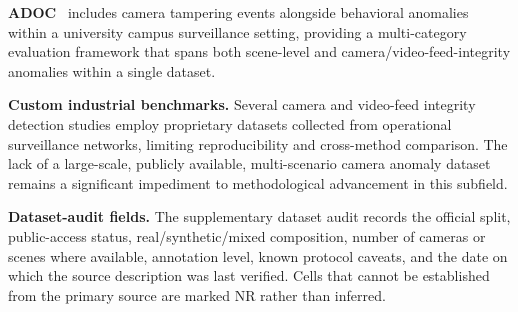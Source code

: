 \documentclass[10pt,a4paper]{article}
\renewcommand{\arraystretch}{1.12}
\begin{document}
\textbf{ADOC}~\citep{doshi2022adoc} includes camera tampering events alongside behavioral anomalies within a university campus surveillance setting, providing a multi-category evaluation framework that spans both scene-level and camera/video-feed-integrity anomalies within a single dataset.

\textbf{Custom industrial benchmarks.} Several camera and video-feed integrity detection studies employ proprietary datasets collected from operational surveillance networks, limiting reproducibility and cross-method comparison. The lack of a large-scale, publicly available, multi-scenario camera anomaly dataset remains a significant impediment to methodological advancement in this subfield.


\begin{table}[!t]
\centering
\caption{Summary of benchmark datasets and study-specific evaluation corpora for camera anomaly and tampering detection.}
\label{tab:camera_datasets}
\renewcommand{\arraystretch}{1.3}
\end{table}


\textbf{Dataset-audit fields.} The supplementary dataset audit records the official split, public-access status, real/synthetic/mixed composition, number of cameras or scenes where available, annotation level, known protocol caveats, and the date on which the source description was last verified. Cells that cannot be established from the primary source are marked NR rather than inferred.
\end{document}
